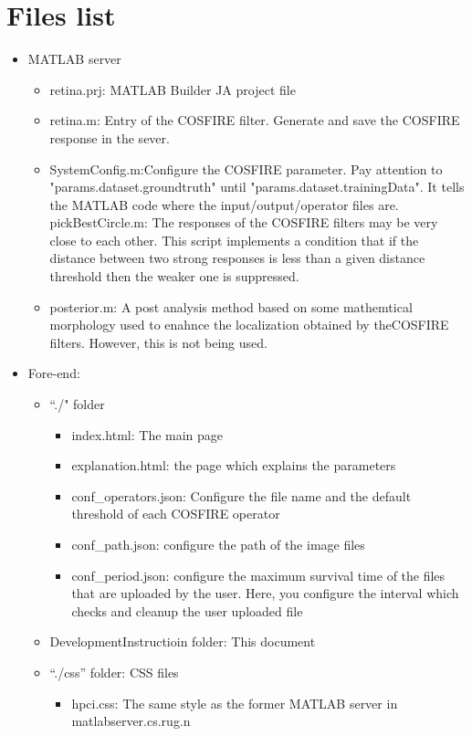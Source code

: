 \documentclass[a4paper]{article}
\begin{document}
\section{Files list}
\begin{itemize}
\item MATLAB server
	\begin{itemize}
	\item retina.prj: MATLAB Builder JA project file
	\item retina.m: Entry of the COSFIRE filter. Generate and save the COSFIRE response in the sever. 
	\item SystemConfig.m:Configure the COSFIRE parameter. Pay attention to "params.dataset.groundtruth" until "params.dataset.trainingData". It tells the MATLAB code where the input/output/operator files are.
	pickBestCircle.m: The responses of the COSFIRE filters may be very close to each other. This script implements a condition that if the distance between two strong responses is less than a given distance threshold then the weaker one is suppressed.
	\item posterior.m: A post analysis method based on some mathemtical morphology used to enahnce the localization obtained by theCOSFIRE filters. However, this is not being used.
	\end{itemize}
\item Fore-end:
\begin{itemize}
\item ``./" folder
	\begin{itemize}
	\item index.html: The main page
	\item explanation.html:		the page which explains the parameters
	\item conf\_operators.json: 	Configure the file name and the default threshold of each COSFIRE operator
	\item conf\_path.json: 		configure the path of the image files
	\item conf\_period.json: 		configure the maximum survival time of the files that are uploaded by the user. Here, you configure the interval which checks and cleanup the user uploaded file
	\end{itemize}
\item DevelopmentInstructioin folder: This document
\item ``./css'' folder: CSS files
	\begin{itemize}
	\item hpci.css:	The same style as the former MATLAB server in matlabserver.cs.rug.n

\end{itemize}
\end{itemize}
\end{itemize}
\end{document}
